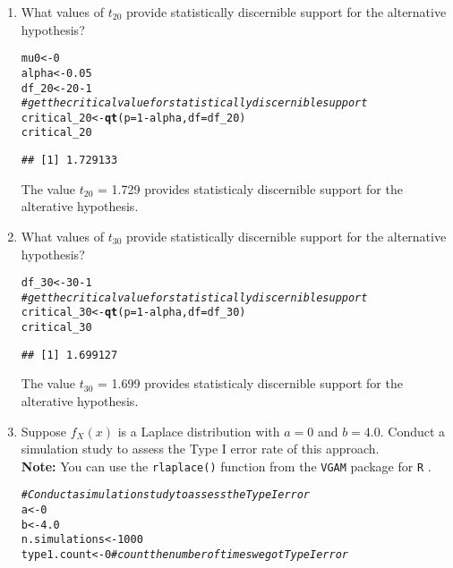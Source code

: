 \documentclass{article}\usepackage[]{graphicx}\usepackage[]{xcolor}
\makeatletter
\newcommand{\hlnum}[1]{\textcolor[rgb]{0.686,0.059,0.569}{#1}}%
\newcommand{\hlcom}[1]{\textcolor[rgb]{0.678,0.584,0.686}{\textit{#1}}}%
\newcommand{\hlopt}[1]{\textcolor[rgb]{0,0,0}{#1}}%
\newcommand{\hldef}[1]{\textcolor[rgb]{0.345,0.345,0.345}{#1}}%
\newcommand{\hlkwb}[1]{\textcolor[rgb]{0.69,0.353,0.396}{#1}}%
\newcommand{\hlkwc}[1]{\textcolor[rgb]{0.333,0.667,0.333}{#1}}%
\newcommand{\hlkwd}[1]{\textcolor[rgb]{0.737,0.353,0.396}{\textbf{#1}}}%
\newenvironment{kframe}{%
 \def\at@end@of@kframe{}%
 \ifinner\ifhmode%
  \def\at@end@of@kframe{\end{minipage}}%
  \begin{minipage}{\columnwidth}%
 \fi\fi%
 \def\FrameCommand##1{\hskip\@totalleftmargin \hskip-\fboxsep
 \colorbox{shadecolor}{##1}\hskip-\fboxsep
     \hskip-\linewidth \hskip-\@totalleftmargin \hskip\columnwidth}%
 \MakeFramed {\advance\hsize-\width
   \@totalleftmargin\z@ \linewidth\hsize
   \@setminipage}}%
 {\par\unskip\endMakeFramed%
 \at@end@of@kframe}
\newenvironment{knitrout}{}{} %
\makeatother
\begin{document}
\begin{enumerate}
\begin{enumerate}
  \item What values of $t_{20}$ provide statistically discernible support for the
  alternative hypothesis?
\begin{knitrout}\scriptsize
{}\color{fgcolor}\begin{kframe}
\begin{alltt}
\hldef{mu0} \hlkwb{<-} \hlnum{0}
\hldef{alpha} \hlkwb{<-} \hlnum{0.05}
\hldef{df_20} \hlkwb{<-} \hlnum{20} \hlopt{-}\hlnum{1}
\hlcom{#get the critical value for statistically discernible support}
\hldef{critical_20} \hlkwb{<-} \hlkwd{qt}\hldef{(}\hlkwc{p} \hldef{=} \hlnum{1} \hlopt{-} \hldef{alpha,} \hlkwc{df} \hldef{= df_20)}
\hldef{critical_20}
\end{alltt}
\begin{verbatim}
## [1] 1.729133
\end{verbatim}
\end{kframe}
\end{knitrout}
The value $t_{20}$ = 1.729 provides statisticaly discernible support for the alterative hypothesis.
  \item What values of $t_{30}$ provide statistically discernible support for the
  alternative hypothesis?
\begin{knitrout}\scriptsize
{}\color{fgcolor}\begin{kframe}
\begin{alltt}
\hldef{df_30} \hlkwb{<-} \hlnum{30} \hlopt{-}\hlnum{1}
\hlcom{#get the critical value for statistically discernible support}
\hldef{critical_30} \hlkwb{<-} \hlkwd{qt}\hldef{(}\hlkwc{p} \hldef{=} \hlnum{1} \hlopt{-} \hldef{alpha,} \hlkwc{df} \hldef{= df_30)}
\hldef{critical_30}
\end{alltt}
\begin{verbatim}
## [1] 1.699127
\end{verbatim}
\end{kframe}
\end{knitrout}
The value $t_{30}$ = 1.699 provides statisticaly discernible support for the alterative hypothesis.
  \item Suppose $f_X(x)$ is a Laplace distribution with $a=0$ and $b=4.0$.
  Conduct a simulation study to assess the Type I error rate of this approach.\\
  \textbf{Note:} You can use the \texttt{rlaplace()} function from the \texttt{VGAM}
  package for \texttt{R} \citep{VGAM}.
\begin{knitrout}\scriptsize
{}\color{fgcolor}\begin{kframe}
\begin{alltt}
\hlcom{#Conduct a simulation study to assess the Type I error }
\hldef{a} \hlkwb{<-} \hlnum{0}
\hldef{b} \hlkwb{<-} \hlnum{4.0}
\hldef{n.simulations} \hlkwb{<-} \hlnum{1000}
\hldef{type1.count} \hlkwb{<-} \hlnum{0} \hlcom{#count the number of times we got Type I error}


\end{alltt}
\end{kframe}
\end{knitrout}
\end{enumerate}
\end{enumerate}
\end{document}
